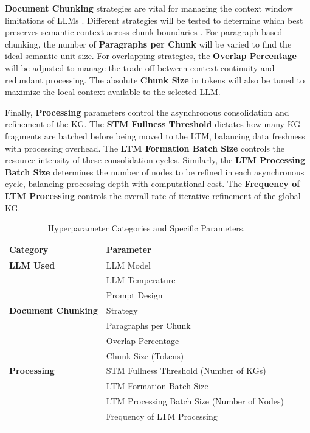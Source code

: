 \textbf{Document Chunking} strategies are vital for managing the context window limitations of LLMs \parencite{RefWorks:RefID:115-ratner2022parallel}. Different strategies will be tested to determine which best preserves semantic context across chunk boundaries \parencite{RefWorks:RefID:104-qu2024semantic}. For paragraph-based chunking, the number of \textbf{Paragraphs per Chunk} will be varied to find the ideal semantic unit size. For overlapping strategies, the \textbf{Overlap Percentage} will be adjusted to manage the trade-off between context continuity and redundant processing. The absolute \textbf{Chunk Size} in tokens will also be tuned to maximize the local context available to the selected LLM.

Finally, \textbf{Processing} parameters control the asynchronous consolidation and refinement of the KG. The \textbf{STM Fullness Threshold} dictates how many KG fragments are batched before being moved to the LTM, balancing data freshness with processing overhead. The \textbf{LTM Formation Batch Size} controls the resource intensity of these consolidation cycles. Similarly, the \textbf{LTM Processing Batch Size} determines the number of nodes to be refined in each asynchronous cycle, balancing processing depth with computational cost. The \textbf{Frequency of LTM Processing} controls the overall rate of iterative refinement of the global KG.
\begin{table}[htbp]
\centering
{}
\begin{tabularx}{\textwidth}{@{} lX @{}} 
\toprule
\textbf{Category} & \textbf{Parameter} \\
\midrule
\addlinespace
\textbf{LLM Used} & LLM Model \\
& LLM Temperature \\
& Prompt Design \\
\addlinespace
\hline
\addlinespace
\textbf{Document Chunking} & Strategy \\
& Paragraphs per Chunk \\
& Overlap Percentage \\
& Chunk Size (Tokens) \\
\addlinespace
\hline
\addlinespace
\textbf{Processing} & STM Fullness Threshold (Number of KGs) \\
& LTM Formation Batch Size \\
& LTM Processing Batch Size (Number of Nodes) \\
& Frequency of LTM Processing \\
\addlinespace
\bottomrule
\end{tabularx}
\caption{Hyperparameter Categories and Specific Parameters.}
\label{tab:hyperparameter_exp_design}
\end{table}

